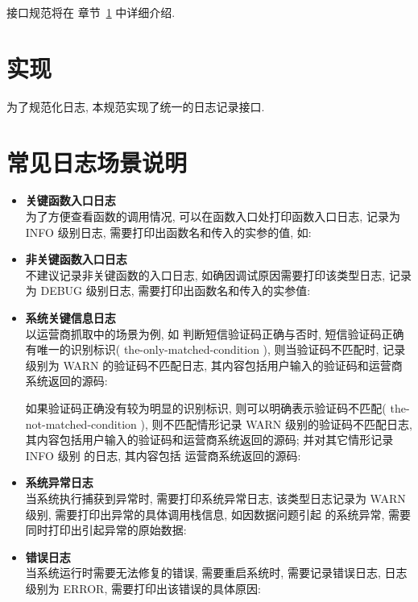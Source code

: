 \documentclass[UTF8,fntef]{ctexart}
\begin{document}
	接口规范将在 章节~\ref{sec:implementation} 中详细介绍.
	
	
	

\section{实现}\label{sec:implementation}
为了规范化日志, 本规范实现了统一的日志记录接口.


	
	
\appendix
\section{常见日志场景说明}
	\begin{itemize}
		\item \textbf{关键函数入口日志} \\
		为了方便查看函数的调用情况, 可以在函数入口处打印函数入口日志, 记录为 INFO 级别日志, 需要打印出函数名和传入的实参的值, 如:
		
		\item \textbf{非关键函数入口日志} \\
		不建议记录非关键函数的入口日志, 如确因调试原因需要打印该类型日志,  记录为 DEBUG 级别日志, 需要打印出函数名和传入的实参值:
		
		\item \textbf{系统关键信息日志} \\
		以运营商抓取中的场景为例, 如 判断短信验证码正确与否时, 短信验证码正确有唯一的识别标识( the-only-matched-condition ), 
		则当验证码不匹配时, 记录级别为 WARN 的验证码不匹配日志, 其内容包括用户输入的验证码和运营商系统返回的源码:
		
		如果验证码正确没有较为明显的识别标识, 则可以明确表示验证码不匹配( the-not-matched-condition ), 
		则不匹配情形记录 WARN 级别的验证码不匹配日志, 其内容包括用户输入的验证码和运营商系统返回的源码; 并对其它情形记录 INFO 级别
		的日志, 其内容包括 运营商系统返回的源码:
		
		\item \textbf{系统异常日志} \\
		当系统执行捕获到异常时, 需要打印系统异常日志, 该类型日志记录为 WARN 级别, 需要打印出异常的具体调用栈信息, 如因数据问题引起
		的系统异常, 需要同时打印出引起异常的原始数据:
		
		\item \textbf{错误日志} \\
		当系统运行时需要无法修复的错误, 需要重启系统时, 需要记录错误日志, 日志级别为 ERROR, 需要打印出该错误的具体原因:
		
	\end{itemize}
\end{document}
